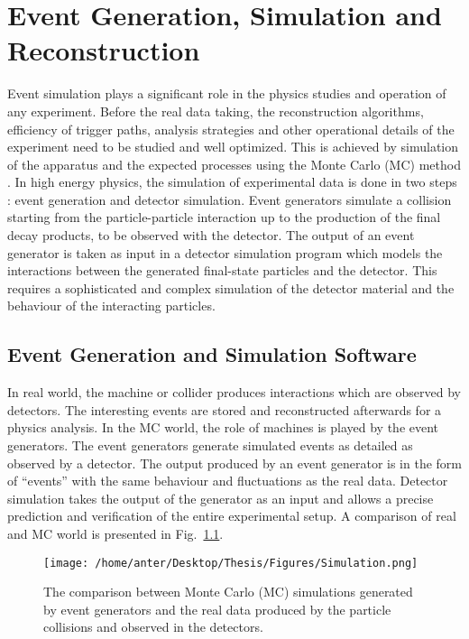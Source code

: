\chapter{Event Generation, Simulation and Reconstruction}
\label{chap:Reconstruction}
Event simulation plays a significant role in the physics studies and operation of any experiment. Before the real data taking, the reconstruction algorithms, efficiency of trigger paths, analysis strategies and other operational details of the experiment need to be studied and well optimized. This is achieved by simulation of the apparatus and the expected processes using the Monte Carlo (MC) method \cite{Monte}. In high energy physics, the simulation of experimental data is done in two steps : event generation and detector simulation. Event generators simulate a collision starting from the particle-particle interaction up to the production of the final decay products, to be observed with the detector. The output of an event generator is taken as input in a detector simulation program which models the interactions between the generated final-state particles and the detector. This requires a sophisticated and complex simulation of the detector material and the behaviour of the interacting particles.

\section{Event Generation and Simulation Software}
In real world, the machine or collider produces interactions which are observed by detectors. The interesting events are stored and reconstructed afterwards for a physics analysis. In the MC world, the role of machines is played by the event generators. The event generators generate simulated events as detailed as observed by a detector. The output produced by an event generator is in the form of ``events'' with the same behaviour and fluctuations as the real data. Detector simulation takes the output of the generator as an input and allows a precise prediction and verification of the entire experimental setup. A comparison of real and MC world is presented in Fig.~\ref{fig:sim}. %

\begin{figure}[h!]
\begin{center}
\vspace*{2mm} 
\texttt{[image: /home/anter/Desktop/Thesis/Figures/Simulation.png]}\\
\vspace*{4mm} 
\caption{The comparison between Monte Carlo (MC) simulations generated by event generators and the real data produced by the particle collisions and observed in the detectors.}
\label{fig:sim}
\end{center}
\end{figure}

